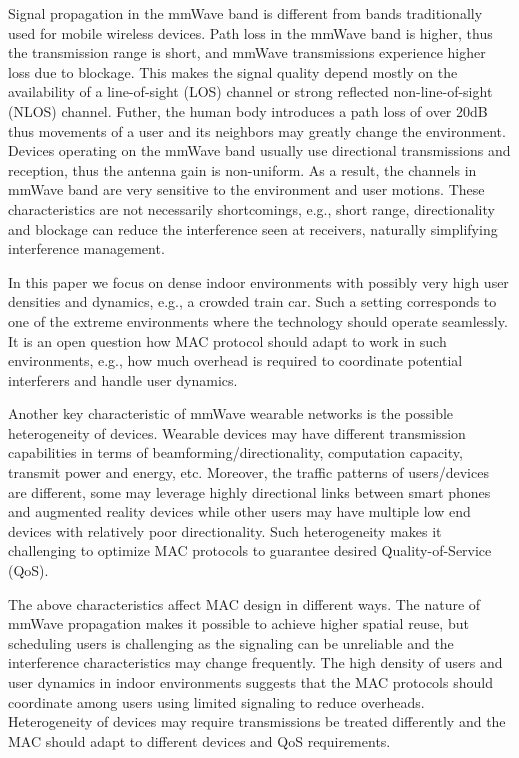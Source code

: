 \documentclass[10pt, conference, letterpaper]{IEEEtran}
\begin{document}


Signal propagation in the mmWave band is different from bands traditionally used for mobile wireless devices. 
Path loss in the mmWave band is higher, thus the transmission range is short, and mmWave transmissions experience higher loss due to blockage. 
This makes the signal quality depend mostly on the availability of a line-of-sight (LOS) channel or strong reflected non-line-of-sight (NLOS) channel.
Futher, the human body introduces a path loss of over 20dB \cite{humanshadowing} thus movements of a user and its neighbors may greatly change the environment.
Devices operating on the mmWave band usually use directional transmissions and reception, thus the antenna gain is non-uniform. 
As a result, the channels in mmWave band are very sensitive to the environment and user motions. 
These characteristics are not necessarily shortcomings, e.g., short range, directionality and blockage can reduce the interference seen at receivers, naturally simplifying interference management. 


In this paper we focus on dense indoor environments with possibly very high user densities and dynamics, e.g., a crowded train car.
Such a setting corresponds to one of the extreme environments where the technology should operate seamlessly. 
It is an open question how MAC protocol should adapt to work in such environments, e.g., how much overhead is required to coordinate potential interferers and handle user dynamics.


Another key characteristic of mmWave wearable networks is the possible heterogeneity of devices. 
Wearable devices may have different transmission capabilities in terms of beamforming/directionality, computation capacity, transmit power and energy, etc. 
Moreover, the traffic patterns of users/devices are different, some may leverage highly directional links between smart phones and augmented reality devices while other users may have multiple low end devices with relatively poor directionality.
Such heterogeneity makes it challenging to optimize MAC protocols to guarantee desired Quality-of-Service (QoS).


The above characteristics affect MAC design in different ways. 
The nature of mmWave propagation makes it possible to achieve higher spatial reuse, but scheduling users is challenging as the signaling can be unreliable and the interference characteristics may change frequently.
The high density of users and user dynamics in indoor environments suggests that the MAC protocols should coordinate among users using limited signaling to reduce overheads. 
Heterogeneity of devices may require transmissions be treated differently and the MAC should adapt to different devices and QoS requirements.
\end{document}
